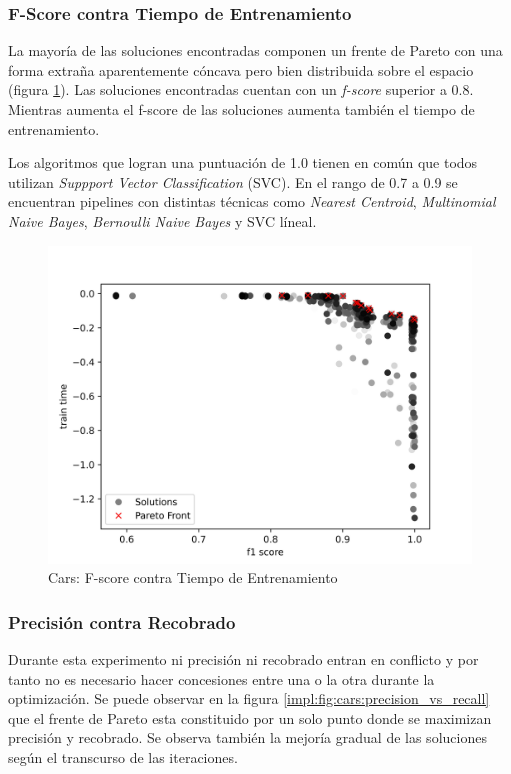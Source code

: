 \subsubsection{F-Score contra Tiempo de Entrenamiento}
La mayor\'ia de las soluciones encontradas componen un frente de Pareto con una forma extra\~na aparentemente c\'oncava pero bien distribuida sobre el espacio (figura \ref{impl:fig:cars:fscore_vs_time}). Las soluciones encontradas cuentan con un \textit{f-score} superior a 0.8. Mientras aumenta el f-score de las soluciones aumenta tambi\'en el tiempo de entrenamiento.

Los algoritmos que logran una puntuaci\'on de 1.0 tienen en com\'un que todos utilizan \textit{Suppport Vector Classification} (SVC). En el rango de 0.7 a 0.9 se encuentran pipelines con distintas t\'ecnicas como \textit{Nearest Centroid}, \textit{Multinomial Naive Bayes}, \textit{Bernoulli Naive Bayes} y SVC l\'ineal.

\begin{figure}[ht]
    \centering
    \includegraphics[scale=0.65]{Pictures/cars_fscore_vs_time.jpg}
    \caption{Cars: F-score contra Tiempo de Entrenamiento}
    \label{impl:fig:cars:fscore_vs_time}
\end{figure}


\subsubsection{Precisi\'on contra Recobrado}
Durante esta experimento  ni precisi\'on ni recobrado entran en conflicto y por tanto no es necesario hacer concesiones entre una o la otra durante la optimizaci\'on. Se puede observar en la figura \ref{impl:fig:cars:precision_vs_recall} que el frente de Pareto esta constituido por un solo punto donde se maximizan precisi\'on y recobrado. Se observa tambi\'en la mejor\'ia gradual de las soluciones seg\'un el transcurso de las iteraciones. 

